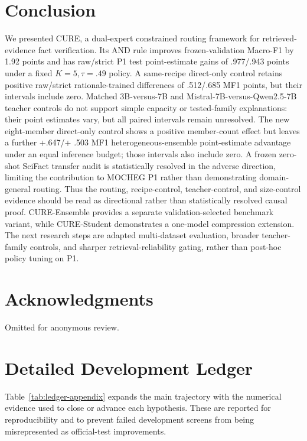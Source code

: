 \documentclass[11pt]{article}
\begin{document}
\section{Conclusion}
We presented \textsc{CURE}, a dual-expert constrained routing framework for retrieved-evidence fact verification. Its AND rule improves frozen-validation Macro-F1 by 1.92 points and has raw/strict P1 test point-estimate gains of .977/.943 points under a fixed $K=5,\tau=.49$ policy. A same-recipe direct-only control retains positive raw/strict rationale-trained differences of .512/.685 MF1 points, but their intervals include zero. Matched 3B-versus-7B and Mistral-7B-versus-Qwen2.5-7B teacher controls do not support simple capacity or tested-family explanations: their point estimates vary, but all paired intervals remain unresolved. The new eight-member direct-only control shows a positive member-count effect but leaves a further +.647/+ .503 MF1 heterogeneous-ensemble point-estimate advantage under an equal inference budget; those intervals also include zero. A frozen zero-shot SciFact transfer audit is statistically resolved in the adverse direction, limiting the contribution to MOCHEG P1 rather than demonstrating domain-general routing. Thus the routing, recipe-control, teacher-control, and size-control evidence should be read as directional rather than statistically resolved causal proof. CURE-Ensemble provides a separate validation-selected benchmark variant, while \textsc{CURE}-Student demonstrates a one-model compression extension. The next research steps are adapted multi-dataset evaluation, broader teacher-family controls, and sharper retrieval-reliability gating, rather than post-hoc policy tuning on P1.

\section*{Acknowledgments}
Omitted for anonymous review.



\clearpage
\appendix
\section{Detailed Development Ledger}
Table~\ref{tab:ledger-appendix} expands the main trajectory with the numerical evidence used to close or advance each hypothesis. These are reported for reproducibility and to prevent failed development screens from being misrepresented as official-test improvements.
\end{document}
